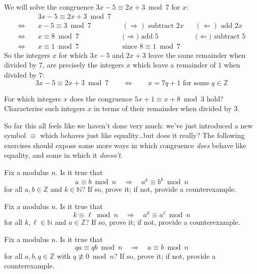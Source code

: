\begin{example}
We will solve the congruence $3x-5 \equiv 2x+3 \bmod 7$ for $x$:
\begin{align*}
& 3x-5 \equiv 2x+3 \bmod 7 && && \\
\Leftrightarrow\quad & x-5 \equiv 3 \bmod 7 && \text{$(\Rightarrow)$ subtract $2x$} && \text{$(\Leftarrow)$ add $2x$} \\
\Leftrightarrow\quad & x \equiv 8 \bmod 7 && \text{($\Rightarrow$) add $5$} && \text{($\Leftarrow$) subtract $5$} \\
\Leftrightarrow\quad & x \equiv 1 \bmod 7 && \text{since $8 \equiv 1 \bmod 7$} &&
\end{align*}
So the integers $x$ for which $3x-5$ and $2x+3$ leave the same remainder when divided by $7$, are precisely the integers $x$ which leave a remainder of $1$ when divided by $7$:
\[ 3x-5 \equiv 2x+3 \bmod 7 \qquad \Leftrightarrow \qquad x = 7q+1 \text{ for some } q \in \mathbb{Z} \]
\end{example}

\begin{exercise}
For which integers $x$ does the congruence $5x+1 \equiv x+8 \bmod 3$ hold? Characterise such integers $x$ in terms of their remainder when divided by $3$.
\end{exercise}

So far this all feels like we haven't done very much: we've just introduced a new symbol $\equiv$ which behaves just like equality\dots but does it really? The following exercises should expose some more ways in which congruence \textit{does} behave like equality, and some in which it \textit{doesn't}.

\begin{exercise}
Fix a modulus $n$. Is it true that
\[ a \equiv b \bmod n \quad \Rightarrow \quad a^k \equiv b^k \bmod n \] for all $a,b \in \mathbb{Z}$ and $k \in \mathbb{N}$? If so, prove it; if not, provide a counterexample.
\end{exercise}

\begin{exercise}
Fix a modulus $n$. Is it true that
\[ k \equiv \ell \bmod n \quad \Rightarrow \quad a^k \equiv a^{\ell} \bmod n \]
for all $k,\ell \in \mathbb{N}$ and $a \in \mathbb{Z}$? If so, prove it; if not, provide a counterexample.
\end{exercise}

\begin{exercise}
Fix a modulus $n$. Is it true that
\[ qa \equiv qb \bmod n \quad \Rightarrow \quad a \equiv b \bmod n \]
for all $a,b,q \in \mathbb{Z}$ with $q \not \equiv 0 \bmod n$? If so, prove it; if not, provide a counterexample.
\end{exercise}


